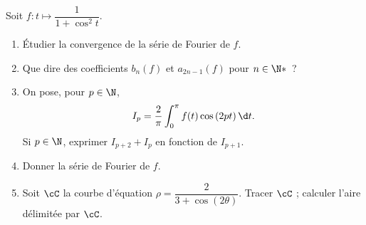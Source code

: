 \begin{enonce}
\begin{exercise}[ID={RMS123 E919, Centrale PC},subtitle={},tags={}]
Soit $f:t\mapsto \dfrac{1}{1+\cos^2 t}$.
\begin{enumerate}
  \item Étudier la convergence de la série de Fourier de $f$.
  \item Que dire des coefficients $b_n(f)$ et $a_{2n-1}(f)$ pour $n\in\N*$~?
  \item On pose, pour $p\in\N$,
    \begin{equation*}
      I_p=\frac2\pi\int_0^\pi f(t)\cos\left( 2pt \right)\d t.
    \end{equation*}
    Si $p\in\N$, exprimer $I_{p+2}+I_{p}$ en fonction de $I_{p+1}$.
  \item Donner la série de Fourier de $f$.
  \item Soit $\cC$ la courbe d'équation $\rho=\dfrac{2}{3+\cos(2\theta)}$.
    Tracer $\cC$ ; calculer l'aire délimitée par $\cC$.
\end{enumerate}
\end{exercise}
\begin{solution}
\end{solution}
\end{enonce}
